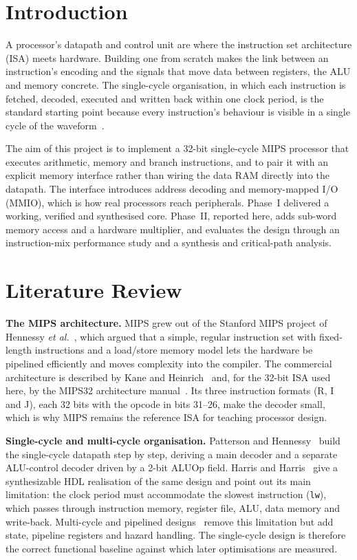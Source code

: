 \documentclass[conference]{IEEEtran}
\begin{document}
\section{Introduction}
A processor's datapath and control unit are where the instruction set architecture (ISA) meets hardware. Building one from scratch makes the link between an instruction's encoding and the signals that move data between registers, the ALU and memory concrete. The single-cycle organisation, in which each instruction is fetched, decoded, executed and written back within one clock period, is the standard starting point because every instruction's behaviour is visible in a single cycle of the waveform~\cite{patterson}.

The aim of this project is to implement a 32-bit single-cycle MIPS processor that executes arithmetic, memory and branch instructions, and to pair it with an explicit memory interface rather than wiring the data RAM directly into the datapath. The interface introduces address decoding and memory-mapped I/O (MMIO), which is how real processors reach peripherals. Phase~I delivered a working, verified and synthesised core. Phase~II, reported here, adds sub-word memory access and a hardware multiplier, and evaluates the design through an instruction-mix performance study and a synthesis and critical-path analysis.

\section{Literature Review}
\textbf{The MIPS architecture.} MIPS grew out of the Stanford MIPS project of Hennessy \textit{et al.}~\cite{hennessy1982}, which argued that a simple, regular instruction set with fixed-length instructions and a load/store memory model lets the hardware be pipelined efficiently and moves complexity into the compiler. The commercial architecture is described by Kane and Heinrich~\cite{kane} and, for the 32-bit ISA used here, by the MIPS32 architecture manual~\cite{mips32}. Its three instruction formats (R, I and J), each 32 bits with the opcode in bits 31--26, make the decoder small, which is why MIPS remains the reference ISA for teaching processor design.

\textbf{Single-cycle and multi-cycle organisation.} Patterson and Hennessy~\cite{patterson} build the single-cycle datapath step by step, deriving a main decoder and a separate ALU-control decoder driven by a 2-bit ALUOp field. Harris and Harris~\cite{harris} give a synthesizable HDL realisation of the same design and point out its main limitation: the clock period must accommodate the slowest instruction (\texttt{lw}), which passes through instruction memory, register file, ALU, data memory and write-back. Multi-cycle and pipelined designs~\cite{patterson,hennessy_ca} remove this limitation but add state, pipeline registers and hazard handling. The single-cycle design is therefore the correct functional baseline against which later optimisations are measured.
\end{document}
